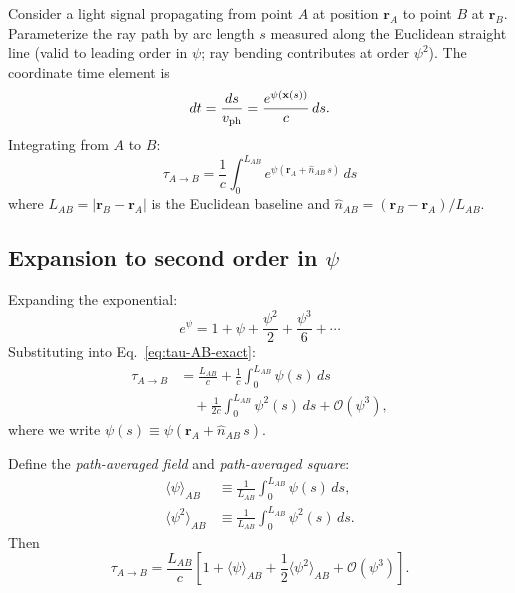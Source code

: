 \documentclass[aps,prd,twocolumn,superscriptaddress,nofootinbib,longbibliography]{revtex4-2}
\begin{document}
Consider a light signal propagating from point $A$ at position $\mathbf{r}_A$
to point $B$ at $\mathbf{r}_B$. Parameterize the ray path by arc length $s$
measured along the Euclidean straight line (valid to leading order in $\psi$;
ray bending contributes at order $\psi^2$). The coordinate time element is
\begin{equation}
dt = \frac{ds}{v_{\rm ph}} = \frac{e^{\psi(\mathbf{x}(s))}}{c}\,ds.
\end{equation}
Integrating from $A$ to $B$:
\begin{equation}\label{eq:tau-AB-exact}
\boxed{
\tau_{A\to B} = \frac{1}{c}\int_0^{L_{AB}} e^{\psi(\mathbf{r}_A + \hat{n}_{AB}\,s)}\,ds
}
\end{equation}
where $L_{AB} = |\mathbf{r}_B - \mathbf{r}_A|$ is the Euclidean baseline and
$\hat{n}_{AB} = (\mathbf{r}_B - \mathbf{r}_A)/L_{AB}$.

\subsection{Expansion to second order in $\psi$}\label{sec:second-order}

Expanding the exponential:
\begin{equation}\label{eq:exp-expand}
e^{\psi} = 1 + \psi + \frac{\psi^2}{2} + \frac{\psi^3}{6} + \cdots
\end{equation}
Substituting into Eq.~\eqref{eq:tau-AB-exact}:
\begin{align}\label{eq:tau-expanded}
\tau_{A\to B} &= \frac{L_{AB}}{c}
+ \frac{1}{c}\int_0^{L_{AB}} \psi(s)\,ds \nonumber\\
&\quad + \frac{1}{2c}\int_0^{L_{AB}} \psi^2(s)\,ds
+ \mathcal{O}(\psi^3),
\end{align}
where we write $\psi(s) \equiv \psi(\mathbf{r}_A + \hat{n}_{AB}\,s)$.

Define the \textit{path-averaged field} and \textit{path-averaged square}:
\begin{align}
\langle\psi\rangle_{AB} &\equiv \frac{1}{L_{AB}}\int_0^{L_{AB}} \psi(s)\,ds, \\
\langle\psi^2\rangle_{AB} &\equiv \frac{1}{L_{AB}}\int_0^{L_{AB}} \psi^2(s)\,ds.
\end{align}
Then
\begin{equation}\label{eq:tau-compact}
\tau_{A\to B} = \frac{L_{AB}}{c}\left[1 + \langle\psi\rangle_{AB}
+ \frac{1}{2}\langle\psi^2\rangle_{AB} + \mathcal{O}(\psi^3)\right].
\end{equation}
\end{document}
